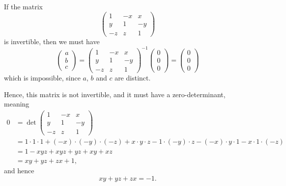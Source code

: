 \begin{enumerate}
          If the matrix
          \[
              \begin{pmatrix}
                  1  & -x & x  \\
                  y  & 1  & -y \\
                  -z & z  & 1
              \end{pmatrix}
          \]
          is invertible, then we must have
          \[
              \begin{pmatrix}
                  a \\
                  b \\
                  c
              \end{pmatrix}
              =
              \begin{pmatrix}
                  1  & -x & x  \\
                  y  & 1  & -y \\
                  -z & z  & 1
              \end{pmatrix}^{-1} \begin{pmatrix}
                  0 \\
                  0 \\
                  0
              \end{pmatrix}
              = \begin{pmatrix}
                  0 \\
                  0 \\
                  0
              \end{pmatrix}
          \]
          which is impossible, since \(a\), \(b\) and \(c\) are distinct.

          Hence, this matrix is not invertible, and it must have a zero-determinant, meaning
          \begin{align*}
              0 & = \det \begin{pmatrix}
                             1  & -x & x  \\
                             y  & 1  & -y \\
                             -z & z  & 1
                         \end{pmatrix}                                                                                                                     \\
                & = 1 \cdot 1 \cdot 1 + (-x) \cdot (-y) \cdot (-z) + x \cdot y \cdot z - 1 \cdot (-y) \cdot z - (-x) \cdot y \cdot 1 - x \cdot 1 \cdot (-z) \\
                & = 1 - xyz + xyz + yz + xy + xz                                                                                                            \\
                & = xy + yz + zx + 1,
          \end{align*}
          and hence
          \[
              xy + yz + zx = -1.
          \]


\end{enumerate}
